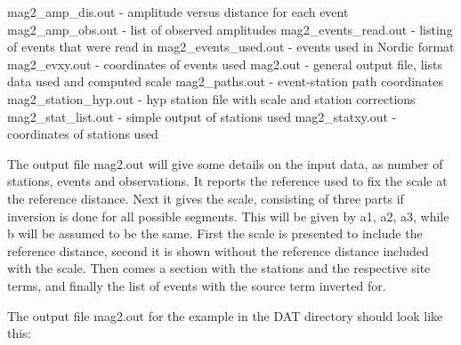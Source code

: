 mag2\_amp\_dis.out - amplitude versus distance for each event\newline
mag2\_amp\_obs.out - list of observed amplitudes\newline
mag2\_events\_read.out - listing of events that were read in\newline
mag2\_events\_used.out - events used in Nordic format\newline
mag2\_evxy.out - coordinates of events used\newline
mag2.out - general output file, lists data used and computed scale\newline
mag2\_paths.out - event-station path coordinates\newline
mag2\_station\_hyp.out - hyp station file with scale and station corrections\newline
mag2\_stat\_list.out - simple output of stations used\newline
mag2\_statxy.out - coordinates of stations used\newline

The output file mag2.out will give some details on the input data, as number of 
stations, events and observations. It reports the reference used to fix the scale at 
the reference distance. Next it gives the scale, consisting of three parts if inversion 
is done for all possible segments. This will be given by a1, a2, a3, while b will be 
assumed to be the same. First the scale is presented to include the reference distance, 
second it is shown without the reference distance included with the scale. Then comes a 
section with the stations and the respective site terms, and finally the list of events 
with the source term inverted for.

The output file mag2.out for the example in the DAT directory should look like this:

